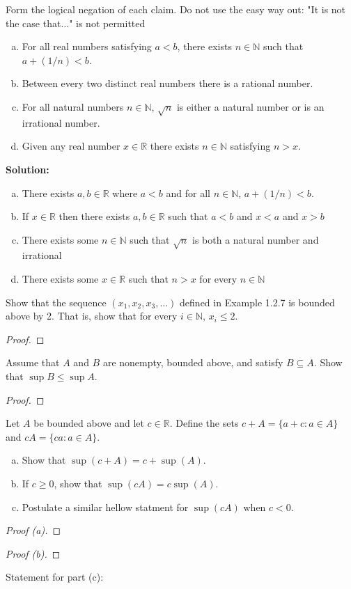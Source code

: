\documentclass[12pt]{article}
\makeatletter
\theoremstyle{homework}
\newenvironment{exercise}[1]
{\def\@currentlabel{#1}\exercisecore}
{\endexercisecore}
\newcommand{\localhead}[1]{\par\smallskip\noindent\textbf{#1}\nobreak\\}%
\newcommand\solution{\localhead{Solution:}}
\newcommand{\Reals}{\ensuremath{\mathbb R}}
\newcommand{\Nats}{\ensuremath{\mathbb N}}
\let\RR\Reals
\makeatother
\begin{document}
\begin{exercise}{1.2.8}
Form the logical negation of each claim. Do not use the easy way out: "It is not the case that$\ldots$" 
is not permitted
\begin{enumerate}[(a)]
\item For all real numbers satisfying $a<b$, there exists $n\in\Nats$ such that $a+(1/n)<b$.
\item Between every two distinct real numbers there is a rational number.
\item For all natural numbers $n\in\Nats$, $\sqrt{n}$ is either a natural number or is an
irrational number.
\item Given any real number $x\in\Reals$ there exists $n\in\Nats$ satisfying $n>x$.
\end{enumerate}
\end{exercise}
\solution
\begin{enumerate}[(a)]
\item There exists $a,b \in \RR$ where $a<b$ and for all $n \in \Nats$, $a+(1/n)<b$.
\item If $x \in \RR$ then there exists $a,b \in \RR$ such that $a<b$ and $x < a$ and $x > b$ 
\item There exists some $n \in \Nats$ such that $\sqrt {n}$ is both a natural number and irrational
\item There exists some $x \in \RR$ such that $n>x$ for every $n \in \Nats$
\end{enumerate}

\begin{exercise}{1.2.9} Show that the sequence $(x_1, x_2, x_3,\ldots)$ defined in Example
1.2.7 is bounded above by 2.  That is, show that for every $i\in\Nats$, $x_i\le 2$.
\end{exercise}
\begin{proof}
\end{proof}

\begin{exercise}{1.3.4}
Assume that $A$ and $B$ are nonempty, bounded above, and satisfy $B\subseteq A$.
Show that $\sup B \le \sup A$.
\end{exercise}
\begin{proof}
\end{proof}

\begin{exercise}{1.3.5}  Let $A$ be bounded above and let $c\in\Reals$.
Define the sets $c+A = \{a+c:a\in A\}$ and $cA = \{ca:a\in A\}$.
\begin{enumerate}[(a)]
\item Show that $\sup(c+A) = c + \sup(A)$.
\item If $c\ge 0$, show that $\sup(cA) = c\sup(A)$.
\item Postulate a similar hellow statment for $\sup(cA)$ when $c<0$.
\end{enumerate}
\end{exercise}
\begin{proof}[Proof (a)]
\end{proof}
\begin{proof}[Proof (b)]
\end{proof}
Statement for part (c): 
\end{document}
